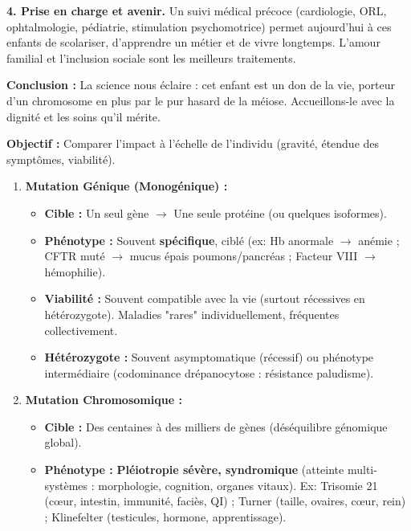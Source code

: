 \documentclass[11pt]{article}
\begin{document}
\begin{exoresolu}
\begin{definition}
    \textbf{4. Prise en charge et avenir.}
    Un suivi médical précoce (cardiologie, ORL, ophtalmologie, pédiatrie, stimulation psychomotrice) permet aujourd'hui à ces enfants de scolariser, d'apprendre un métier et de vivre longtemps. L'amour familial et l'inclusion sociale sont les meilleurs traitements.

    \textbf{Conclusion :} La science nous éclaire : cet enfant est un don de la vie, porteur d'un chromosome en plus par le pur hasard de la méiose. Accueillons-le avec la dignité et les soins qu'il mérite.
    \end{definition}
\end{exoresolu}

\begin{methode}
    \textbf{Objectif :} Comparer l'impact à l'échelle de l'individu (gravité, étendue des symptômes, viabilité).
    \begin{enumerate}
        \item \textbf{Mutation Génique (Monogénique) :}
              \begin{itemize}
                  \item \textbf{Cible :} Un seul gène $\rightarrow$ Une seule protéine (ou quelques isoformes).
                  \item \textbf{Phénotype :} Souvent \textbf{spécifique}, ciblé (ex: Hb anormale $\rightarrow$ anémie ; CFTR muté $\rightarrow$ mucus épais poumons/pancréas ; Facteur VIII $\rightarrow$ hémophilie).
                  \item \textbf{Viabilité :} Souvent compatible avec la vie (surtout récessives en hétérozygote). Maladies "rares" individuellement, fréquentes collectivement.
                  \item \textbf{Hétérozygote :} Souvent asymptomatique (récessif) ou phénotype intermédiaire (codominance drépanocytose : résistance paludisme).
              \end{itemize}
        \item \textbf{Mutation Chromosomique :}
              \begin{itemize}
                  \item \textbf{Cible :} Des centaines à des milliers de gènes (déséquilibre génomique global).
                  \item \textbf{Phénotype :} \textbf{Pléiotropie sévère, syndromique} (atteinte multi-systèmes : morphologie, cognition, organes vitaux). Ex: Trisomie 21 (cœur, intestin, immunité, faciès, QI) ; Turner (taille, ovaires, cœur, rein) ; Klinefelter (testicules, hormone, apprentissage).

\end{itemize}
\end{enumerate}
\end{methode}
\end{document}
